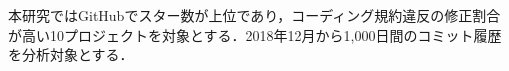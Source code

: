 \documentclass[T,J]{fose} %
\begin{document}
本研究ではGitHubでスター数が上位であり，コーディング規約違反の修正割合が高い10プロジェクトを対象とする．2018年12月から1,000日間のコミット履歴を分析対象とする．
%
%
%
%
%
%
\end{document}
